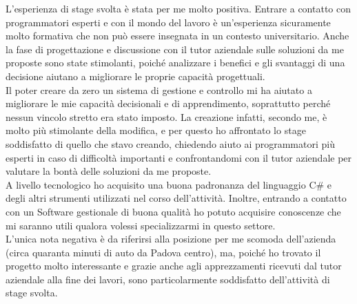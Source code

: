 L'esperienza di stage svolta è stata per me molto positiva. Entrare a contatto con programmatori esperti e con il mondo del lavoro è un'esperienza sicuramente molto formativa che non può essere insegnata in un contesto universitario. Anche la fase di progettazione e discussione con il tutor aziendale sulle soluzioni da me proposte sono state stimolanti, poiché analizzare i benefici e gli svantaggi di una decisione aiutano a migliorare le proprie capacità progettuali.
\\Il poter creare da zero un sistema di gestione e controllo mi ha aiutato a migliorare le mie capacità decisionali e di apprendimento, soprattutto perché nessun vincolo stretto era stato imposto. La creazione infatti, secondo me, è molto più stimolante della modifica, e per questo ho affrontato lo stage soddisfatto di quello che stavo creando, chiedendo aiuto ai programmatori più esperti in caso di difficoltà importanti e confrontandomi con il tutor aziendale per valutare la bontà delle soluzioni da me proposte.
\\A livello tecnologico ho acquisito una buona padronanza del linguaggio C\# e degli altri strumenti utilizzati nel corso dell'attività. Inoltre, entrando a contatto con un Software gestionale di buona qualità ho potuto acquisire conoscenze che mi saranno utili qualora volessi specializzarmi in questo settore.
\\L'unica nota negativa è da riferirsi alla posizione per me scomoda dell'azienda (circa quaranta minuti di auto da Padova centro), ma, poiché ho trovato il progetto molto interessante e grazie anche agli apprezzamenti ricevuti dal tutor aziendale alla fine dei lavori, sono particolarmente soddisfatto dell'attività di stage svolta.